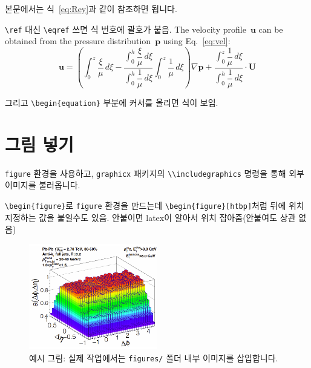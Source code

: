 \documentclass[doctor, korean]{pnuthesis_me}
\begin{document}
본문에서는 식~\ref{eq:Rey}과 같이 참조하면 됩니다.

\verb|\ref| 대신 \verb|\eqref| 쓰면 식 번호에 괄호가 붙음.
The velocity profile~$\mathbf{u}$ can be obtained from the pressure distribution~$\mathbf{p}$ using Eq.~\eqref{eq:vel}:
\begin{equation}\label{eq:vel}
    \mathbf{u} = \left( 
        \int_0^z \dfrac{\xi}{\mu} \, d\xi 
        - \dfrac{ \displaystyle\int_0^h \dfrac{\xi}{\mu} \, d\xi }{ \displaystyle\int_0^h \dfrac{1}{\mu} \, d\xi } 
        \int_0^z \dfrac{1}{\mu} \, d\xi 
        \right) \nabla{\mathbf{p}}
        + \dfrac{ \displaystyle\int_0^z \dfrac{1}{\mu} \, d\xi }{ \displaystyle\int_0^h \dfrac{1}{\mu} \, d\xi } \cdot \mathbf{U}
\end{equation}

그리고 \verb|\begin{equation}| 부분에 커서를 올리면 식이 보임.







\section{그림 넣기}
\texttt{figure} 환경을 사용하고, \texttt{graphicx} 패키지의 \verb|\\includegraphics| 명령을 통해 외부 이미지를 불러옵니다.

\verb|\begin{figure}|로 \texttt{figure} 환경을 만드는데 \verb|\begin{figure}[htbp]|처럼 뒤에 위치 지정하는 값을 붙일수도 있음.
안붙이면 latex이 알아서 위치 잡아줌(안붙여도 상관 없음)

\begin{figure}[htbp]
    \centering
    \includegraphics[width=0.5\textwidth]{samplefig1.png}
    \caption{예시 그림: 실제 작업에서는 \texttt{figures/} 폴더 내부 이미지를 삽입합니다.}
    \label{fig:example}
\end{figure}
\end{document}
